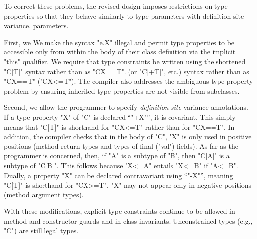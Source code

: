 To correct these problems, the revised \Xten design imposes
restrictions on type properties so that they 
behave similarly to type
\ifwild
parameters with definition-site variance.
\else
parameters.
\fi

\ifwild
First, we
\else
We
\fi
make the syntax \xcd"e.X"
illegal and permit type properties to be accessible only from
within the body of their class definition via the
implicit \xcd"this" qualifier.  We require that type
constraints be written using the shortened \xcd"C[T]"
\ifwild
syntax rather than as \xcd"C{X==T}".
\else
(or \xcd"C[+T]", etc.) syntax rather than as \xcd"C{X==T}" (\xcd"C{X<=T}").
\fi
The compiler also addresses the
ambiguous type property problem by ensuring inherited type properties are
not visible from subclasses.

\ifwild
Second, we allow the programmer to specify
\emph{definition-site}
variance annotations.
If a type property \xcd"X" of \xcd"C" is declared ``\xcd"+X"'', it is
covariant.
This simply means that \xcd"C[T]"
is shorthand for \xcd"C{X<=T}" rather than for \xcd"C{X==T}".
In addition, the compiler checks that in the body of \xcd"C",
\xcd"X" is only used in positive positions (method return types
and types of final (\xcd"val") fields).
As far as the programmer is concerned, then, if \xcd"A"
is a subtype of \xcd"B", then
\xcd"C[A]" is a subtype of \xcd"C[B]".
This follows because \xcd"X<=A" entails \xcd"X<=B" if \xcd"A<=B".
Dually, a property \xcd"X" can be declared contravariant 
using ``\xcd"-X"'', meaning \xcd"C[T]" is shorthand for
\xcd"C{X>=T}".  \xcd"X" may not appear only in negative
positions (method argument types).
\fi

With these
modifications, explicit type constraints continue to be allowed
in method and constructor guards and in class invariants.
Unconstrained types (e.g., \xcd"C") are still legal types.
